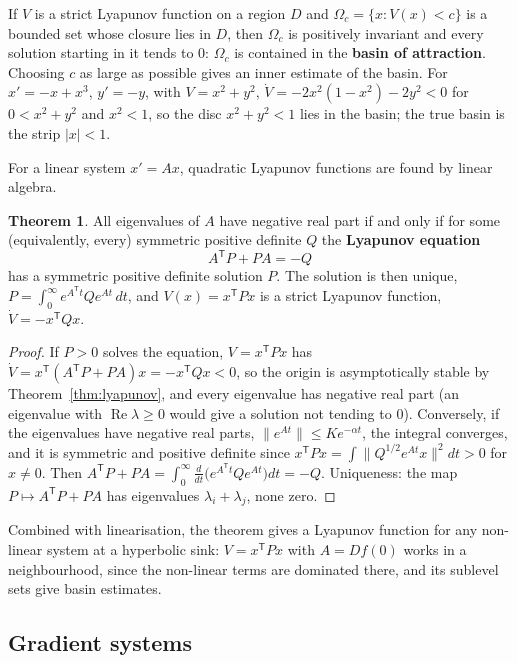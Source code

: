 \documentclass[11pt,a4paper]{article}
\numberwithin{equation}{section}
\DeclareMathOperator{\Real}{Re}
\theoremstyle{definition}
\newtheorem{thm}{Theorem}[subsection]
\begin{document}
If $V$ is a strict Lyapunov function on a region $D$ and $\Omega_c = \{x : V(x) < c\}$ is a bounded set whose closure lies in $D$, then $\Omega_c$ is positively invariant and every solution starting in it tends to $0$:
$\Omega_c$ is contained in the \textbf{basin of attraction}. Choosing $c$ as large as possible gives an inner estimate of the basin. For $x' = -x + x^3$, $y' = -y$, with $V = x^2 + y^2$, $\dot V = -2x^2(1 - x^2) - 2y^2 < 0$ for
$0 < x^2 + y^2$ and $x^2 < 1$, so the disc $x^2 + y^2 < 1$ lies in the basin; the true basin is the strip $|x| < 1$.

For a linear system $x' = Ax$, quadratic Lyapunov functions are found by linear algebra.

\begin{thm}
\label{thm:lyapeq}
All eigenvalues of $A$ have negative real part if and only if for some (equivalently, every) symmetric positive definite $Q$ the \textbf{Lyapunov equation}
\[
A^{\mathsf T}P + PA = -Q
\]
has a symmetric positive definite solution $P$. The solution is then unique, $P = \int_0^\infty e^{A^{\mathsf T}t}Qe^{At}\,dt$, and $V(x) = x^{\mathsf T}Px$ is a strict Lyapunov function, $\dot V = -x^{\mathsf T}Qx$.
\end{thm}

\begin{proof}
If $P > 0$ solves the equation, $V = x^{\mathsf T}Px$ has $\dot V = x^{\mathsf T}(A^{\mathsf T}P + PA)x = -x^{\mathsf T}Qx < 0$, so the origin is asymptotically stable by Theorem~\ref{thm:lyapunov}, and every eigenvalue has negative real part (an
eigenvalue with $\Real\lambda \geq 0$ would give a solution not tending to $0$). Conversely, if the eigenvalues have negative real parts, $\|e^{At}\| \leq Ke^{-\alpha t}$, the integral converges, and it is symmetric and
positive definite since $x^{\mathsf T}Px = \int\|Q^{1/2}e^{At}x\|^2dt > 0$ for $x \neq 0$. Then $A^{\mathsf T}P + PA = \int_0^\infty\frac{d}{dt}\bigl(e^{A^{\mathsf T}t}Qe^{At}\bigr)dt = -Q$. Uniqueness: the map $P \mapsto A^{\mathsf T}P + PA$ has eigenvalues
$\lambda_i + \lambda_j$, none zero.
\end{proof}

Combined with linearisation, the theorem gives a Lyapunov function for any non-linear system at a hyperbolic sink: $V = x^{\mathsf T}Px$ with $A = Df(0)$ works in a neighbourhood, since the non-linear terms
are dominated there, and its sublevel sets give basin estimates.

\subsection{Gradient systems}
\label{ssec:gradient}
\end{document}
